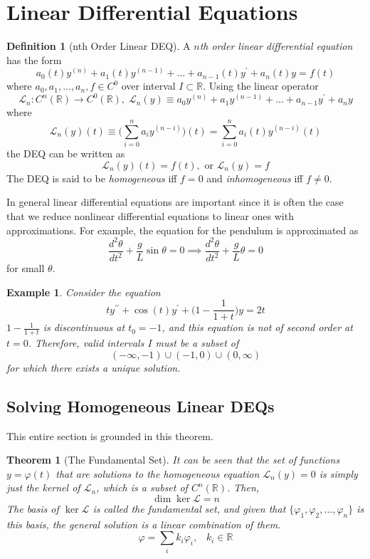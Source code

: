 \documentclass{article}
\newtheorem{theorem}{Theorem}[section]
\newtheorem{example}{Example}[section]
\theoremstyle{remark}
\theoremstyle{definition}
\newtheorem{definition}{Definition}[section]
\begin{document}
\section{Linear Differential Equations}

\begin{definition}[nth Order Linear DEQ]
A \textit{$n$th order linear differential equation} has the form
\[a_0 (t) y^{(n)} + a_1 (t) y^{(n-1)} + \ldots + a_{n-1} (t) y^\prime + a_n (t) y = f(t)\]
where $a_0, a_1, \ldots, a_n, f \in C^0$ over interval $I \subset \mathbb{R}$. Using the linear operator 
\[\mathcal{L}_n : C^n (\mathbb{R}) \longrightarrow C^0 (\mathbb{R}), \; \mathcal{L}_n (y) \equiv a_0 y^{(n)} + a_1 y^{(n-1)} + \ldots + a_{n-1} y^\prime + a_n y\]
where 
\[\mathcal{L}_n (y) (t) \equiv \bigg( \sum_{i=0}^n a_i y^{(n-i)} \bigg) (t) = \sum_{i=0}^n a_i (t) y^{(n-i)} (t)\]
the DEQ can be written as
\[\mathcal{L}_n (y) (t) = f(t), \text{ or } \mathcal{L}_n (y) = f\]
The DEQ is said to be \textit{homogeneous} iff $f = 0$ and \textit{inhomogeneous} iff $f \neq 0$. 
\end{definition}

In general linear differential equations are important since it is often the case that we reduce nonlinear differential equations to linear ones with approximations. For example, the equation for the pendulum is approximated as
\[\frac{d^2 \theta}{d t^2} + \frac{g}{L} \sin{\theta} = 0 \implies \frac{d^2 \theta}{d t^2} + \frac{g}{L} \theta = 0\]
for small $\theta$. 

\begin{example}
Consider the equation 
\[t y^{\prime \prime} + \cos{(t)} y^\prime + \Big( 1 - \frac{1}{1+t}\Big) y = 2t\]
$1 - \frac{1}{1+t}$ is discontinuous at $t_0 = -1$, and this equation is not of second order at $t=0$. Therefore, valid intervals $I$ must be a subset of 
\[(-\infty, -1) \cup (-1, 0) \cup (0, \infty)\]
for which there exists a unique solution. 
\end{example}

\subsection{Solving Homogeneous Linear DEQs}
This entire section is grounded in this theorem. 
\begin{theorem}[The Fundamental Set]
It can be seen that the set of functions $y = \varphi(t)$ that are solutions to the homogeneous equation $\mathcal{L}_n (y) = 0$ is simply just the kernel of $\mathcal{L}_n$, which is a subset of $C^n (\mathbb{R})$. Then, 
\[\dim \ker{\mathcal{L}} = n \]
The basis of $\ker{\mathcal{L}}$ is called the \textit{fundamental set}, and given that $\{\varphi_1, \varphi_2, \ldots, \varphi_n\}$ is this basis, the general solution is a linear combination of them. 
\[\varphi = \sum_i k_i \varphi_i, \;\;\; k_i \in \mathbb{R}\]
\end{theorem}
\end{document}
